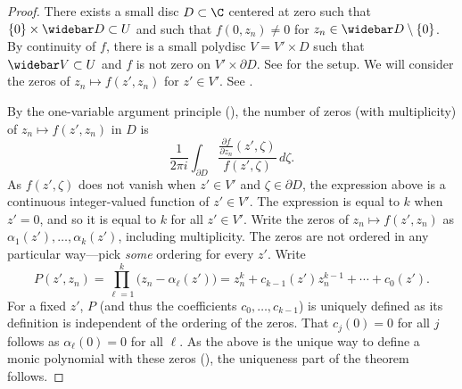 \begin{proof}
There exists a small disc $D\subset\C$ centered at zero such that $\{0\}\times\widebar D\subset U$ and such that $f(0,z_n)\neq0$ for $z_n\in\widebar D\setminus\{0\}$. By continuity of $f$, there is a small polydisc $V=V'\times D$ such that $\widebar V\subset U$ and $f$ is not zero on $V'\times\partial D$. See  for the setup. We will consider the zeros of $z_n\mapsto f(z',z_n)$ for $z'\in V'$. See .

By the one-variable argument principle (), the number of zeros (with multiplicity) of $z_n\mapsto f(z',z_n)$ in $D$ is
\[
\frac1{2\pi i}\int_{\partial D}\frac{\frac{\partial f}{\partial z_n}(z',\zeta)}{f(z',\zeta)}\,d\zeta.
\]
As $f(z',\zeta)$ does not vanish when $z'\in V'$ and $\zeta\in\partial D$, the expression above is a continuous integer-valued function of $z'\in V'$. The expression is equal to $k$ when $z'=0$, and so it is equal to $k$ for all $z'\in V'$.
Write the zeros of $z_n\mapsto f(z',z_n)$ as $\alpha_1(z'),\ldots,\alpha_k(z')$, including multiplicity. The zeros are not ordered in any particular way---pick \emph{some} ordering for every $z'$. Write
\[
P(z',z_n)=\prod_{\ell=1}^k\bigl(z_n-\alpha_\ell(z')\bigr)=z_n^k+c_{k-1}(z')z_n^{k-1}+\cdots+c_0(z').
\]
For a fixed $z'$, $P$ (and thus the coefficients $c_0,\ldots,c_{k-1}$) is uniquely defined as its definition is independent of the ordering of the zeros. That $c_j(0)=0$ for all $j$ follows as $\alpha_\ell(0)=0$ for all $\ell$. As the above is the unique way to define a monic polynomial with these zeros (), the uniqueness part of the theorem follows.


\end{proof}
